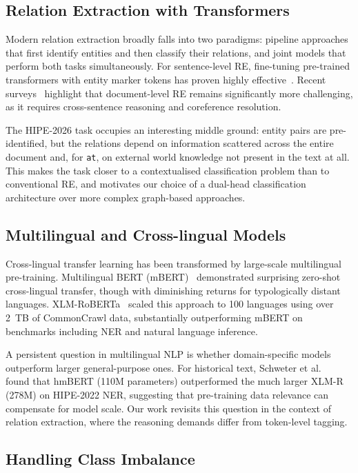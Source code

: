 \documentclass[runningheads]{llncs}
\begin{document}
\subsection{Relation Extraction with Transformers}

Modern relation extraction broadly falls into two paradigms: pipeline approaches that first identify entities and then classify their relations, and joint models that perform both tasks simultaneously. For sentence-level RE, fine-tuning pre-trained transformers with entity marker tokens has proven highly effective~\cite{devlin2019}. Recent surveys~\cite{lyu2024} highlight that document-level RE remains significantly more challenging, as it requires cross-sentence reasoning and coreference resolution.

The HIPE-2026 task occupies an interesting middle ground: entity pairs are pre-identified, but the relations depend on information scattered across the entire document and, for \texttt{at}, on external world knowledge not present in the text at all. This makes the task closer to a contextualised classification problem than to conventional RE, and motivates our choice of a dual-head classification architecture over more complex graph-based approaches.

\subsection{Multilingual and Cross-lingual Models}

Cross-lingual transfer learning has been transformed by large-scale multilingual pre-training. Multilingual BERT (mBERT)~\cite{devlin2019} demonstrated surprising zero-shot cross-lingual transfer, though with diminishing returns for typologically distant languages. XLM-RoBERTa~\cite{conneau2020} scaled this approach to 100 languages using over 2~TB of CommonCrawl data, substantially outperforming mBERT on benchmarks including NER and natural language inference.

A persistent question in multilingual NLP is whether domain-specific models outperform larger general-purpose ones. For historical text, Schweter et al.~\cite{schweter2022} found that hmBERT (110M parameters) outperformed the much larger XLM-R (278M) on HIPE-2022 NER, suggesting that pre-training data relevance can compensate for model scale. Our work revisits this question in the context of relation extraction, where the reasoning demands differ from token-level tagging.

\subsection{Handling Class Imbalance}
\end{document}
